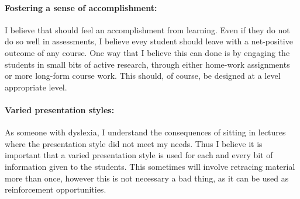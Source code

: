 \documentclass[14pt,letter]{article}
\begin{document}
\paragraph{Fostering a sense of accomplishment:} I believe that should 
feel an accomplishment from learning. Even if they do not do so well 
in assessments, I believe evey student should leave with a net-positive 
outcome of any course. One way that I believe this can done is by 
engaging the students in small bits of active research, through either 
home-work assignments or more long-form course work. This should, of course, 
be designed at a level appropriate level.

\paragraph{Varied presentation styles:} As someone with dyslexia, I understand
 the consequences of sitting in lectures  where the presentation 
style did not meet my needs. Thus I believe it is important that a varied presentation 
style is used for each and every bit of information given to the students. 
This sometimes will involve retracing material more than once, however this 
is not necessary a bad thing, as it can be used as reinforcement opportunities. 



\end{document}
